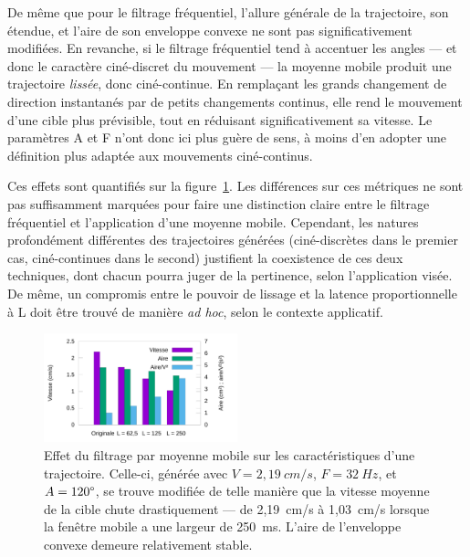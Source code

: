 	De même que pour le filtrage fréquentiel, l'allure générale de la trajectoire, son étendue, et l'aire de son enveloppe convexe ne sont pas significativement modifiées. En revanche, si le filtrage fréquentiel tend à accentuer les angles --- et donc le caractère ciné-discret du mouvement --- la moyenne mobile produit une trajectoire \emph{lissée}, donc ciné-continue. En remplaçant les grands changement de direction instantanés par de petits changements continus, elle rend le mouvement d'une cible plus prévisible, tout en réduisant significativement sa vitesse. Le paramètres A et F n'ont donc ici plus guère de sens, à moins d'en adopter une définition plus adaptée aux mouvements ciné-continus.
	
	Ces effets sont quantifiés sur la figure~\ref{fig:filteringByMovingAverageHistograms}. Les différences sur ces métriques ne sont pas suffisamment marquées pour faire une distinction claire entre le filtrage fréquentiel et l'application d'une moyenne mobile. Cependant, les natures profondément différentes des trajectoires générées (ciné-discrètes dans le premier cas, ciné-continues dans le second) justifient la coexistence de ces deux techniques, dont chacun pourra juger de la pertinence, selon l'application visée. De même, un compromis entre le \og pouvoir \fg{} de lissage et la latence proportionnelle à L doit être trouvé de manière \emph{ad hoc}, selon le contexte applicatif.
	
	\begin{figure}[!htb]
		\centering
		\includegraphics[width=0.5\textwidth]{figures/ch5/filteringByMovingAverageHistograms}
		\caption[Effet du filtrage par moyenne mobile]{Effet du filtrage par moyenne mobile sur les caractéristiques d'une trajectoire. Celle-ci, générée avec $V=2,19~cm/s$, $F=32~Hz$, et $A=120\degree{}$, se trouve modifiée de telle manière que la vitesse moyenne de la cible chute drastiquement --- de 2,19~cm/s à 1,03~cm/s lorsque la fenêtre mobile a une largeur de 250~ms. L'aire de l'enveloppe convexe demeure relativement stable.}
		\label{fig:filteringByMovingAverageHistograms}
	\end{figure}
	
